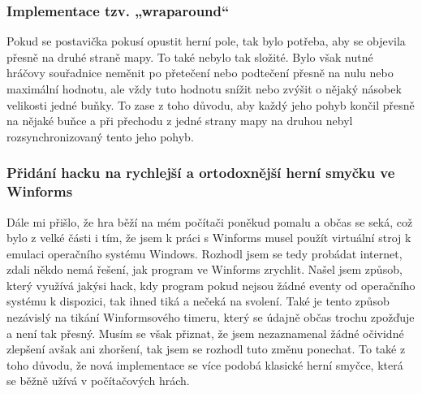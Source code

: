 \documentclass[a4]{article}
\begin{document}
\subsubsection{Implementace tzv. „wraparound“}
Pokud se postavička pokusí opustit herní pole, tak bylo potřeba, aby se objevila přesně na druhé straně mapy. To také nebylo tak složité. Bylo však nutné hráčovy souřadnice neměnit po přetečení nebo podtečení přesně na nulu nebo maximální hodnotu, ale vždy tuto hodnotu snížit nebo zvýšit o nějaký násobek velikosti jedné buňky. To zase z toho důvodu, aby každý jeho pohyb končil přesně na nějaké buňce a při přechodu z jedné strany mapy na druhou nebyl rozsynchronizovaný tento jeho pohyb.
\subsubsection{Přidání hacku na rychlejší a ortodoxnější herní smyčku ve Winforms}
Dále mi přišlo, že hra běží na mém počítači poněkud pomalu a občas se seká, což bylo z velké části i tím, že jsem k práci s Winforms musel použít virtuální stroj k emulaci operačního systému Windows. Rozhodl jsem se tedy probádat internet, zdali někdo nemá řešení, jak program ve Winforms zrychlit. Našel jsem způsob, který využívá jakýsi hack, kdy program pokud nejsou žádné eventy od operačního systému k dispozici, tak ihned tiká a nečeká na svolení. Také je tento způsob nezávislý na tikání Winformsového timeru, který se údajně občas trochu zpožďuje a není tak přesný. Musím se však přiznat, že jsem nezaznamenal žádné očividné zlepšení avšak ani zhoršení, tak jsem se rozhodl tuto změnu ponechat. To také z toho důvodu, že nová implementace se více podobá klasické herní smyčce, která se běžně užívá v počítačových hrách.
\end{document}
